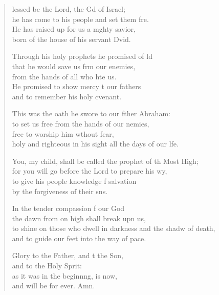 \begin{verse}
  \begin{patverse}
lessed be the Lord, the Gd of Israel;\Med\\
he has come to his people and set them fre.\\
He has raised up for us a m\pointup{\i}ghty savior,\Med\\
born of the house of his servant Dvid.

Through his holy prophets he promised of ld\Flex\\
that he would save us frm our enemies,\Med\\
from the hands of all who hte us.\\
He promised to show mercy t our fathers\Med\\
and to remember his holy cvenant.

This was the oath he swore to our fther Abraham:\Med\\
to set us free from the hands of our nemies,\\
free to worship him w\pointup{\i}thout fear,\Med\\
holy and righteous in his sight all the days of our l\pointup{\i}fe.

You, my child, shall be called the prophet of th Most High;\Med\\
for you will go before the Lord to prepare his wy,\\
to give his people knowledge f salvation\Med\\
by the forgiveness of their s\pointup{\i}ns.

In the tender compassion f our God\Med\\
the dawn from on high shall break upn us,\\
to shine on those who dwell in darkness and the shadw of death,\Med\\
and to guide our feet into the way of pace.

Glory to the Father, and t the Son,\Med\\
and to the Holy Sp\pointup{\i}rit:\\
as it was in the beginn\pointup{\i}ng, is now,\Med\\
and will be for ever. Amn.
  \end{patverse}
  \end{verse}
